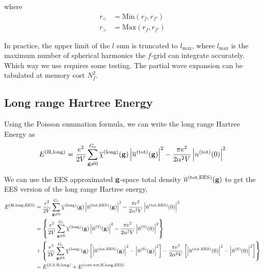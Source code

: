 \documentclass[paper=a4, fontsize=11pt]{article} %
\numberwithin{equation}{section} %
\numberwithin{figure}{section} %
\numberwithin{table}{section} %
\newcommand{\ol}{\overline}
\newcommand{\bg}{{\bf{g}}}
\newcommand{\rS}{{\mathrm{S}}}
\newcommand{\rEES}{{\mathrm{EES}}}
\newcommand{\rcore}{{\mathrm{core}}}
\newcommand{\rlong}{{\mathrm{long}}}
\newcommand{\rH}{{\mathrm{H}}}
\newcommand{\rtot}{{\mathrm{tot}}}
\newcommand{\Gc}{{G_{\mathrm{c}}}}
\begin{document}
where
\begin{equation}
\begin{split}
r_{<} &= \mathrm{Min}(r_f, r_{f'}) \\
r_{>} &= \mathrm{Max}(r_f, r_{f'})
\end{split}
\end{equation}

In practice, the upper limit of the $l$ sum is truncated to $l_{\mathrm{max}}$, where $l_{\mathrm{max}}$ is the maximum number of spherical harmonics the $f$-grid can integrate accurately. Which way we use requires some testing. The partial wave expansion can be tabulated at memory cost $N_f^2$.


\subsection{Long range Hartree Energy}
Using the Poisson summation formula, we can write the long range Hartree Energy as
\begin{equation}\label{eq:Hlong}
\begin{split}
E^{(\rH,\rlong)}
&= \frac{e^2}{2V} \sum_{\bg \neq 0}^\Gc \ol \chi^{(\rlong)} (\bg)\left|\ol n^{(\rtot)}(\bg)\right|^2 - \frac{\pi e^2}{2\alpha^2 V}\left|n^{(\rtot)}(0)\right|^2 \\
\end{split}
\end{equation}

We can use the EES approximated $\bg$-space total density $\ol{n}^{(\rtot,\rEES)}(\bg)$ to get the EES version of the long range Hartree energy,
\begin{equation} \label{eq:HlongEESsim}
\begin{split}
E^{(\rH,\rlong,\rEES)}
&= \frac{e^2}{2V} \sum_{\bg \neq 0}^\Gc \ol \chi^{(\rlong)} (\bg)\left|\ol{n}^{(\rtot,\rEES)}(\bg)\right|^2- \frac{\pi e^2}{2\alpha^2 V}\left|\overline{n}^{(\rtot,\rEES)}(0)\right|^2 \\
&= \left\{\frac{e^2}{2V} \sum_{\bg \neq 0}^\Gc \ol \chi^{(\rlong)} (\bg)\left|\ol{n}^{(\rS)}(\bg)\right|^2- \frac{\pi e^2}{2\alpha^2 V}\left|\overline{n}^{(\rS)}(0)\right|^2 \right\}\\
&+\left\{\frac{e^2}{2V} \sum_{\bg \neq 0}^\Gc \ol \chi^{(\rlong)} (\bg)\left[\left|\ol{n}^{(\rtot,\rEES)}(\bg)\right|^2 -  \left|\ol{n}^{(\rS)}(\bg)\right|^2\right]- \frac{\pi e^2}{2\alpha^2 V}\left[\left|\ol {n}^{(\rtot,\rEES)}(0)\right|^2 - \left|\ol {n}^{(\rS)}(0)\right|^2\right]\right\}\\
&= E^{(\rS,\rS,\rH,\rlong)} + E^{(\rcore,\rtot,\rH,\rlong,\rEES)}
\end{split}
\end{equation}
\end{document}
